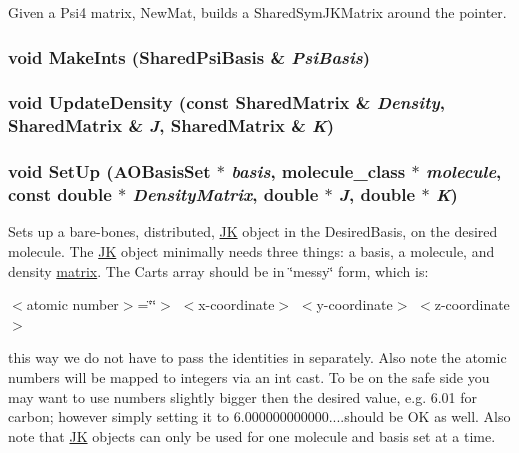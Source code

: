 Given a Psi4 matrix, NewMat, builds a SharedSymJKMatrix around the pointer. \hypertarget{classpsi_1_1scf_1_1Psi4JK_a76433c0bae70a347630890a4c497b488}{
\subsubsection[{MakeInts}]{\setlength{\rightskip}{0pt plus 5cm}void MakeInts ({\bf SharedPsiBasis} \& {\em PsiBasis})}}
\label{classpsi_1_1scf_1_1Psi4JK_a76433c0bae70a347630890a4c497b488}
\hypertarget{classpsi_1_1scf_1_1Psi4JK_a36bddec95b737f7ee42688b0de2e730b}{
\subsubsection[{UpdateDensity}]{\setlength{\rightskip}{0pt plus 5cm}void UpdateDensity (const {\bf SharedMatrix} \& {\em Density}, \/  {\bf SharedMatrix} \& {\em J}, \/  {\bf SharedMatrix} \& {\em K})}}
\label{classpsi_1_1scf_1_1Psi4JK_a36bddec95b737f7ee42688b0de2e730b}
\hypertarget{classJKBuilder_1_1JK_a13b685265e196c183897777ec2f3136a}{
\subsubsection[{SetUp}]{\setlength{\rightskip}{0pt plus 5cm}void SetUp ({\bf AOBasisSet} $\ast$ {\em basis}, \/  {\bf molecule\_\-class} $\ast$ {\em molecule}, \/  const double $\ast$ {\em DensityMatrix}, \/  double $\ast$ {\em J}, \/  double $\ast$ {\em K})}}
\label{classJKBuilder_1_1JK_a13b685265e196c183897777ec2f3136a}


Sets up a bare-\/bones, distributed, \hyperlink{classJKBuilder_1_1JK}{JK} object in the DesiredBasis, on the desired molecule. The \hyperlink{classJKBuilder_1_1JK}{JK} object minimally needs three things: a basis, a molecule, and density \hyperlink{classJKBuilder_1_1matrix}{matrix}. The Carts array should be in \char`\"{}messy\char`\"{} form, which is:\par
 $<$atomic number$>$=\char`\"{}\char`\"{}$>$ $<$x-\/coordinate$>$ $<$y-\/coordinate$>$ $<$z-\/coordinate$>$\par
 this way we do not have to pass the identities in separately. Also note the atomic numbers will be mapped to integers via an int cast. To be on the safe side you may want to use numbers slightly bigger then the desired value, e.g. 6.01 for carbon; however simply setting it to 6.000000000000....should be OK as well. Also note that \hyperlink{classJKBuilder_1_1JK}{JK} objects can only be used for one molecule and basis set at a time.


